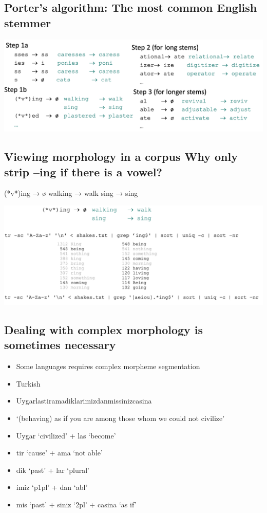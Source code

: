 \documentclass[11pt]{article}
\theoremstyle{definition}
\begin{document}
\subsection{Porter’s algorithm: 
The most common English stemmer}
\includegraphics[width=\textwidth]{4.png}

\subsection{Viewing morphology in a corpus
Why only strip –ing if there is a vowel?}

(*v*)ing → ø walking → walk
sing → sing

\includegraphics[width=\textwidth]{5.png}

\subsection{Dealing with complex morphology is
sometimes necessary}
\begin{itemize}
  \item Some languages requires complex morpheme segmentation
  \item Turkish
  \item Uygarlastiramadiklarimizdanmissinizcasina
  \item `(behaving) as if you are among those whom we could not civilize’
  \item Uygar `civilized’ + las `become’
  \item tir `cause’ + ama `not able’
  \item dik `past’ + lar ‘plural’
  \item imiz ‘p1pl’ + dan ‘abl’
  \item mis ‘past’ + siniz ‘2pl’ + casina ‘as if’
\end{itemize}
\end{document}

